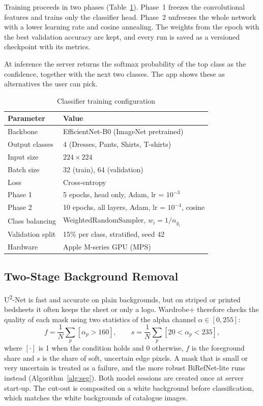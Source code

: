 \documentclass[conference]{IEEEtran}
\begin{document}
Training proceeds in two phases (Table~\ref{tab:hyper}). Phase~1 freezes the convolutional features and trains only the classifier head. Phase~2 unfreezes the whole network with a lower learning rate and cosine annealing. The weights from the epoch with the best validation accuracy are kept, and every run is saved as a versioned checkpoint with its metrics.

At inference the server returns the softmax probability of the top class as the confidence, together with the next two classes. The app shows these as alternatives the user can pick.

\begin{table}[t]
\caption{Classifier training configuration}
\label{tab:hyper}
\centering
\begin{tabular}{ll}
\toprule
Parameter & Value \\
\midrule
Backbone & EfficientNet-B0 (ImageNet pretrained) \\
Output classes & 4 (Dresses, Pants, Shirts, T-shirts) \\
Input size & $224\times224$ \\
Batch size & 32 (train), 64 (validation) \\
Loss & Cross-entropy \\
Phase 1 & 5 epochs, head only, Adam, lr = $10^{-3}$ \\
Phase 2 & 10 epochs, all layers, Adam, lr = $10^{-4}$, cosine \\
Class balancing & WeightedRandomSampler, $w_i=1/n_{y_i}$ \\
Validation split & 15\% per class, stratified, seed 42 \\
Hardware & Apple M-series GPU (MPS) \\
\bottomrule
\end{tabular}
\end{table}

\subsection{Two-Stage Background Removal}\label{sec:seg}
U\textsuperscript{2}-Net is fast and accurate on plain backgrounds, but on striped or printed bedsheets it often keeps the sheet or only a logo. Wardrobe+ therefore checks the quality of each mask using two statistics of the alpha channel $\alpha\in[0,255]$:
\begin{equation}
  f = \frac{1}{N}\sum_p [\alpha_p > 160], \qquad
  s = \frac{1}{N}\sum_p [20 < \alpha_p < 235],
\end{equation}
where $[\cdot]$ is 1 when the condition holds and 0 otherwise, $f$ is the foreground share and $s$ is the share of soft, uncertain edge pixels.
A mask that is small or very uncertain is treated as a failure, and the more robust BiRefNet-lite runs instead (Algorithm~\ref{alg:seg}). Both model sessions are created once at server start-up. The cut-out is composited on a white background before classification, which matches the white backgrounds of catalogue images.
\end{document}

